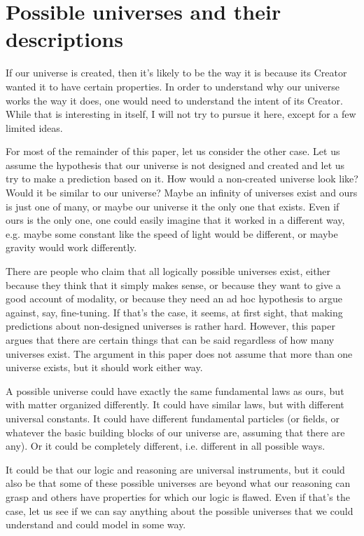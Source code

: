 \documentclass[a4paper
,draft
]{article}
\newcommand{\svn}[2][]{\todo[author=Virgil,color=red!25!white,#1]{#2}}
\newcommand{\paper}[1]{paper}
\newcommand{\ghilimele}[1]{``#1"}
\begin{document}
\section{Possible universes and their descriptions}
\label{sec:possible-universes}

If our universe is created, then it's likely to be the way it is because
its Creator wanted it to have certain properties.
In order to understand why our universe works the way it does,
one would need to understand the intent of its Creator.
While that is interesting in itself, I will not try to pursue it here,
except for a few limited ideas.

For most of the remainder of this \paper{}, let us consider the other case.
Let us assume the hypothesis that our universe is not designed and created
and let us try to make a prediction based on it.
How would a non-created universe look like?
Would it be similar to our universe?
Maybe an infinity of universes exist and ours is just one of many,
or maybe our universe it the only one that exists.
Even if ours is the only one, one could easily imagine that it worked
in a different way, e.g. maybe some constant like the speed of light would be
different, or maybe gravity would work differently.

There are people who claim that all logically possible universes exist,
either because they think that it simply makes sense, or because they want to
give a good account of modality, or because they need
an ad hoc\svn{Do I need the \ghilimele{ad-hoc} part?}{} hypothesis
to argue against, say, fine-tuning.
If that's the case, it seems, at first sight, that making predictions about
non-designed universes is rather hard.
However, this paper argues that there are certain things that can be said
regardless of how many universes exist.
The argument in this \paper{} does not assume that more than
one universe exists, but it should work either way.

A possible universe
could have exactly the same fundamental laws as ours, but with matter
organized differently.
It could have similar laws, but with different universal constants.
It could have different fundamental particles (or fields, or whatever the basic
building blocks of our universe are, assuming that there are any).
Or it could be completely different, i.e. different in all possible ways.

It could be that our logic and reasoning are universal instruments,
but it could also be that some of these possible universes are
beyond what our reasoning can grasp and others have properties
for which our logic is flawed.
Even if that's the case, let us see if we can say anything about
the possible universes that we could understand and could model in some way.
\end{document}
